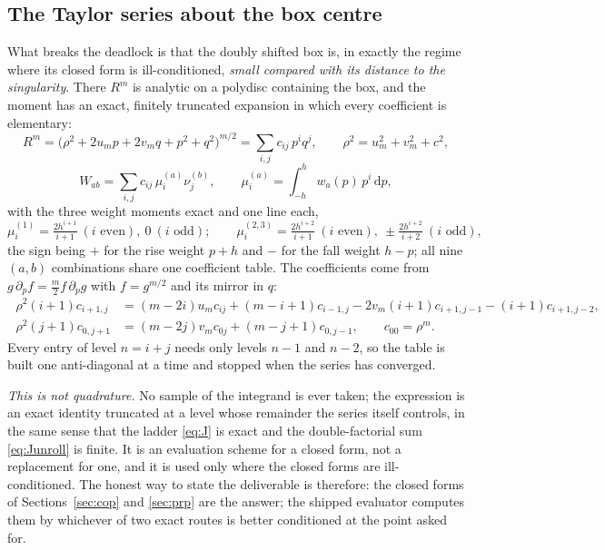 \documentclass[11pt]{article}
\theoremstyle{remark}
\newcommand{\dd}{\mathrm{d}}
\begin{document}
\subsection{The Taylor series about the box centre}
\label{sec:taylor}

What breaks the deadlock is that the doubly shifted box is, in exactly the regime where its
closed form is ill-conditioned, \emph{small compared with its distance to the singularity}.
There $R^m$ is analytic on a polydisc containing the box, and the moment has an exact,
finitely truncated expansion in which every coefficient is elementary:
\begin{equation}
\boxed{\;
R^m = \bigl(\rho^2 + 2u_mp + 2v_mq + p^2 + q^2\bigr)^{m/2} = \sum_{i,j} c_{ij}\,p^iq^j,
\qquad \rho^2 = u_m^2 + v_m^2 + c^2, \;}
\end{equation}
\begin{equation}
W_{ab} = \sum_{i,j} c_{ij}\,\mu_i^{(a)}\nu_j^{(b)},
\qquad \mu_i^{(a)} = \int_{-h}^{h} w_a(p)\,p^i\,\dd p,
\end{equation}
with the three weight moments exact and one line each,
\begin{equation}
\mu_i^{(1)} = \tfrac{2h^{i+1}}{i+1}\ (i \text{ even}),\ 0\ (i\text{ odd});\qquad
\mu_i^{(2,3)} = \tfrac{2h^{i+2}}{i+1}\ (i\text{ even}),\ \pm\tfrac{2h^{i+2}}{i+2}\ (i\text{ odd}),
\end{equation}
the sign being $+$ for the rise weight $p+h$ and $-$ for the fall weight $h-p$; all nine
$(a,b)$ combinations share one coefficient table. The coefficients come from
$g\,\partial_p f = \tfrac{m}{2}f\,\partial_p g$ with $f = g^{m/2}$ and its mirror in $q$:
\begin{equation}
\boxed{\;
\begin{aligned}
\rho^2(i+1)c_{i+1,j} &= (m-2i)u_m c_{ij} + (m-i+1)c_{i-1,j} - 2v_m(i+1)c_{i+1,j-1} - (i+1)c_{i+1,j-2},\\
\rho^2(j+1)c_{0,j+1} &= (m-2j)v_m c_{0j} + (m-j+1)c_{0,j-1},\qquad c_{00} = \rho^m .
\end{aligned}\;}
\end{equation}
Every entry of level $n = i+j$ needs only levels $n-1$ and $n-2$, so the table is built one
anti-diagonal at a time and stopped when the series has converged.

\emph{This is not quadrature.} No sample of the integrand is ever taken; the expression is
an exact identity truncated at a level whose remainder the series itself controls, in the
same sense that the ladder \eqref{eq:J} is exact and the double-factorial sum
\eqref{eq:Junroll} is finite. It is an evaluation scheme for a closed form, not a
replacement for one, and it is used only where the closed forms are ill-conditioned. The
honest way to state the deliverable is therefore: the closed forms of
Sections~\ref{sec:cop} and \ref{sec:prp} are the answer; the shipped evaluator computes
them by whichever of two exact routes is better conditioned at the point asked for.
\end{document}

